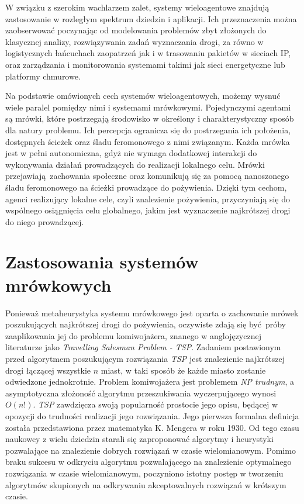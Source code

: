 {{        %
        W związku z szerokim wachlarzem zalet, systemy wieloagentowe znajdują zastosowanie w rozległym spektrum dziedzin
        i aplikacji. Ich przeznaczenia można zaobserwować poczynając od modelowania problemów zbyt złożonych do
        klasycznej analizy, rozwiązywania zadań wyznaczania drogi, za równo w logistycznych łańcuchach zaopatrzeń jak i
        w trasowaniu pakietów w sieciach IP, oraz zarządzania i monitorowania systemami takimi jak sieci energetyczne
        lub platformy chmurowe\cite{Dorri2018MultiAgentSA, Oprea2004ApplicationsOM}.

        Na podstawie omówionych cech systemów wieloagentowych, możemy wysnuć wiele paralel pomiędzy nimi i systemami
        mrówkowymi. Pojedynczymi agentami są mrówki, które postrzegają środowisko w określony i charakterystyczny sposób
        dla natury problemu. Ich percepcja ogranicza się do postrzegania ich położenia, dostępnych ścieżek oraz śladu
        feromonowego z nimi związanym. Każda mrówka jest w pełni autonomiczna, gdyż nie wymaga dodatkowej interakcji do
        wykonywania działań prowadzących do realizacji lokalnego celu. Mrówki przejawiają zachowania społeczne oraz
        komunikują się za pomocą nanoszonego śladu feromonowego na ścieżki prowadzące do pożywienia. Dzięki tym cechom,
        agenci realizujący lokalne cele, czyli znalezienie pożywienia, przyczyniają się do wspólnego osiągnięcia celu
        globalnego, jakim jest wyznaczenie najkrótszej drogi do niego prowadzącej.
    }

    \section{Zastosowania systemów mrówkowych}
    {
        Ponieważ metaheurystyka systemu mrówkowego jest oparta o zachowanie mrówek poszukujących najkrótszej drogi do
        pożywienia, oczywiste zdają się być próby zaaplikowania jej do problemu komiwojażera, znanego w anglojęzycznej
        literaturze jako \textit{Travelling Salesman Problem - TSP}. Zadaniem postawionym przed algorytmem poszukującym
        rozwiązania \textit{TSP} jest znalezienie najkrótszej drogi łączącej wszystkie $n$ miast, w taki sposób że każde
        miasto zostanie odwiedzone jednokrotnie. Problem komiwojażera jest problemem \textit{NP trudnym}, a
        asymptotyczna złożoność algorytmu przeszukiwania wyczerpującego wynosi $O(n!)$. \textit{TSP} zawdzięcza swoją
        popularność prostocie jego opisu, będącej w opozycji do trudności realizacji jego rozwiązania. Jego pierwsza
        formalna definicja została przedstawiona przez matematyka K. Mengera w roku
        1930\cite{Mazidi2017MetaHeuristicAF}. Od tego czasu naukowcy z wielu dziedzin starali się zaproponować algorytmy
        i heurystyki pozwalające na znalezienie dobrych rozwiązań w czasie wielomianowym. Pomimo braku sukcesu w
        odkryciu algorytmu pozwalającego na znalezienie optymalnego rozwiązania w czasie wielomianowym, poczyniono
        istotny postęp w tworzeniu algorytmów skupionych na odkrywaniu akceptowalnych rozwiązań w krótszym czasie.

}}
